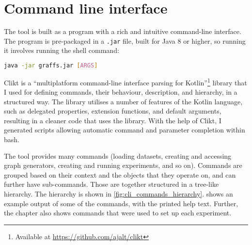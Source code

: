 \section{Command line interface}\label{sec:cli}

The \graffs tool is built as a program with a rich and intuitive command-line interface.
The program is pre-packaged in a \texttt{.jar} file, built for Java 8 or higher, so running it involves running the shell command:
\begin{lstlisting}[language=bash,style=light]
java -jar graffs.jar [ARGS]
\end{lstlisting}

Clikt is a \enquote{multiplatform command-line interface parsing for Kotlin}\footnote{Available at \url{https://github.com/ajalt/clikt}} library that I used for defining commands, their behaviour, description, and hierarchy, in a structured way.
The library utilises a number of features of the Kotlin language, such as delegated properties, extension functions, and default arguments, resulting in a cleaner code that uses the library.
With the help of Clikt, I generated scripts allowing automatic command and parameter completion within bash.

The \graffs tool provides many commands (loading datasets, creating and accessing graph generators, creating and running experiments, and so on).
Commands are grouped based on their context and the objects that they operate on, and can further have sub-commands.
Those are together structured in a tree-like hierarchy.
The hierarchy is shown in \autoref{fig:cli_commands_hierarchy}.
 shows an example output of some of the commands, with the printed help text.
Further, the  chapter also shows commands that were used to set up each experiment.


